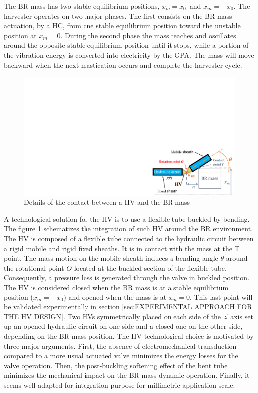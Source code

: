 \documentclass[3p,twocolumn,preprint]{elsarticle}
\begin{document}
The BR mass has two stable equilibrium positions, \mbox{$x_m = x_0$ }and \mbox{$x_m = -x_0$}. The harvester operates on two major phases. The first consists on the BR mass actuation, by a HC, from one stable equilibrium position toward the unstable position at $x_m = 0$. During the second phase the mass reaches and oscillates around the opposite stable equilibrium position until it stops, while a portion of the vibration energy is converted into electricity by the GPA. The mass will move backward when the next mastication occurs and complete the harvester cycle.
\begin{figure}[!htbp]
	\centering
	\captionsetup{justification=centering}
	\includegraphics[trim={20.5cm 0cm 0cm 11.5cm},clip, width=0.8\linewidth]{figures/HV_actuation_detail.pdf}
	\caption{Details of the contact between a HV and the BR mass} 
	\label{fig:HV_actuation_detail}
\end{figure}

A technological solution for the HV is to use a flexible tube buckled by bending. The figure \ref{fig:HV_actuation_detail} schematizes the integration of such HV around the BR environment. The HV is composed of a flexible tube connected to the hydraulic circuit between a rigid mobile and rigid fixed sheaths. It is in contact with the mass at the T point. The mass motion on the mobile sheath induces a bending angle $\theta$ around the rotational point $O$ located at the buckled section of the flexible tube. Consequently, a pressure loss is generated through the valve in buckled position. The HV is considered closed when the BR mass is at a stable equilibrium position ($x_m=\pm x_0$) and opened when the mass is at $x_m=0$. This last point will be validated experimentally in section \ref{sec:EXPERIMENTAL APPROACH FOR THE HV DESIGN}. Two HVs symmetrically placed on each side of the $\vec{z}$ axis set up an opened hydraulic circuit on one side and a closed one on the other side, depending on the BR mass position. The HV technological choice is motivated by three major arguments. First, the absence of electromechanical transduction compared to a more usual actuated valve minimizes the energy losses for the valve operation. Then, the post-buckling softening effect of the bent tube minimizes the mechanical impact on the BR mass dynamic operation. Finally, it seems well adapted for integration purpose for millimetric application scale.
\end{document}
